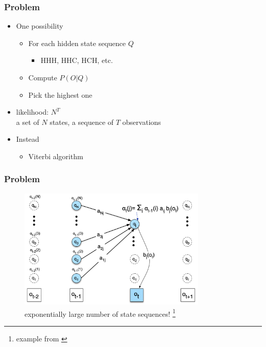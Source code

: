 \documentclass{beamer}
\newcommand\dangersign[1][2ex]{%
  \renewcommand\stacktype{L}%
  \scaleto{\stackon[1.3pt]{\color{red}$\triangle$}{\tiny !}}{#1}%
}
\begin{document}
\begin{frame}
    \frametitle{Problem}
    \begin{itemize}
        \item One possibility 
        \begin{itemize}
            \item For each hidden state sequence $Q$
            \begin{itemize}
                \item HHH, HHC, HCH, etc.
            \end{itemize}
            \item Compute $P(O|Q)$
            \item Pick the highest one
        \end{itemize}
        \item \dangersign[5ex]  likelihood: $N^T$ \\a set of $N$ states, a sequence of $T$ observations
        \item Instead
        \begin{itemize}
            \item \color{red}Viterbi algorithm
        \end{itemize}
    \end{itemize}
    

    \end{frame}
\begin{frame}
    \frametitle{Problem}
    \begin{figure}[H]
        \centering
        \includegraphics[width=0.8\textwidth]{img/16.png}
        \caption{exponentially large number of state sequences! \footnote{example from \cite{Jurafsky:2009:SLP:1214993}}}

        \end{figure}
\end{frame}
\end{document}
